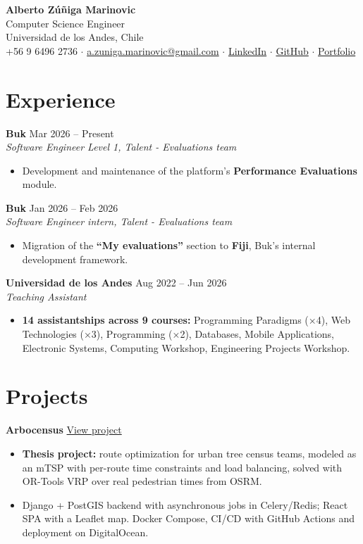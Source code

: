 \documentclass[a4paper,11pt]{article}
\newcommand{\entry}[3]{%
  {\large\textbf{#1}} \hfill {\color{muted}#2} \\
  {\color{accent}\textit{#3}}\par
}
\newcommand{\entrygap}{\vspace{5pt}}
\begin{document}
\begin{center}
  {\huge\bfseries Alberto Zúñiga Marinovic} \\[5pt]
  {\large\color{accent} Computer Science Engineer} \\[2pt]
  {\color{muted} Universidad de los Andes, Chile} \\[5pt]
  +56 9 6496 2736 \quad$\cdot$\quad
  \href{mailto:a.zuniga.marinovic@gmail.com}{a.zuniga.marinovic@gmail.com} \quad$\cdot$\quad
  \href{https://www.linkedin.com/in/alberto-zuniga-marinovic}{LinkedIn} \quad$\cdot$\quad
  \href{https://github.com/AlbertoZuiga}{GitHub} \quad$\cdot$\quad
  \href{https://albertozuiga.github.io/en}{Portfolio}
\end{center}

\section*{Experience}

\entry{Buk}{Mar 2026 -- Present}{Software Engineer Level 1, Talent - Evaluations team}
\begin{itemize}
  \item Development and maintenance of the platform's \textbf{Performance Evaluations} module.
\end{itemize}
\entrygap

\entry{Buk}{Jan 2026 -- Feb 2026}{Software Engineer intern, Talent - Evaluations team}
\begin{itemize}
  \item Migration of the \textbf{``My evaluations''} section to \textbf{Fiji}, Buk's internal development framework.
\end{itemize}
\entrygap

\entry{Universidad de los Andes}{Aug 2022 -- Jun 2026}{Teaching Assistant}
\begin{itemize}
  \item \textbf{14 assistantships across 9 courses:} Programming Paradigms (×4), Web Technologies (×3), Programming (×2),
        Databases, Mobile Applications, Electronic Systems, Computing Workshop, Engineering Projects Workshop.
\end{itemize}

\section*{Projects}

{\large\textbf{Arbocensus}}  \hfill \href{https://albertozuiga.github.io/en/projects/arbocensus}{View project}
\begin{itemize}
  \item \textbf{Thesis project:} route optimization for urban tree census teams, modeled as an mTSP
        with per-route time constraints and load balancing, solved with OR-Tools VRP over real pedestrian times from OSRM.
  \item Django + PostGIS backend with asynchronous jobs in Celery/Redis; React SPA with a Leaflet map.
        Docker Compose, CI/CD with GitHub Actions and deployment on DigitalOcean.
\end{itemize}
\entrygap
\end{document}
